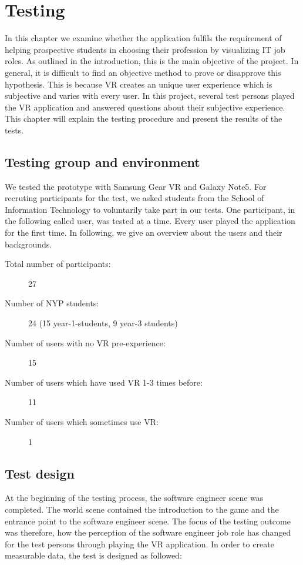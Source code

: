 \chapter{Testing}\label{testing}
In this chapter we examine whether the application fulfils the requirement of helping prospective students in choosing their profession by visualizing IT job roles. As outlined in the introduction, this is the main objective of the project. In general, it is difficult to find an objective method to prove or disapprove this hypothesis. This is because VR creates an unique user experience which is subjective and varies with every user. In this project, several test persons played the VR application and answered questions about their subjective experience. This chapter will explain the testing procedure and present the results of the tests.

\section{Testing group and environment}
We tested the prototype with Samsung Gear VR and Galaxy Note5. For recruting participants for the test, we asked students from the School of Information Technology to voluntarily take part in our tests. One participant, in the following called user, was tested at a time. Every user played the application for the first time. In following, we give an overview about the users and their backgrounds. 
\begin{description}
	\item[Total number of participants:] 27
	\item[Number of NYP students:] 24 (15 year-1-students, 9 year-3 students)
	\item[Number of users with no VR pre-experience:] 15
	\item[Number of users which have used VR 1-3 times before:] 11
	\item[Number of users which sometimes use VR:] 1
\end{description}
\section{Test design}
At the beginning of the testing process, the software engineer scene was completed. The world scene contained the introduction to the game and the entrance point to the software engineer scene. The focus of the testing outcome was therefore, how the perception of the software engineer job role has changed for the test persons through playing the VR application. In order to create measurable data, the test is designed as followed:

